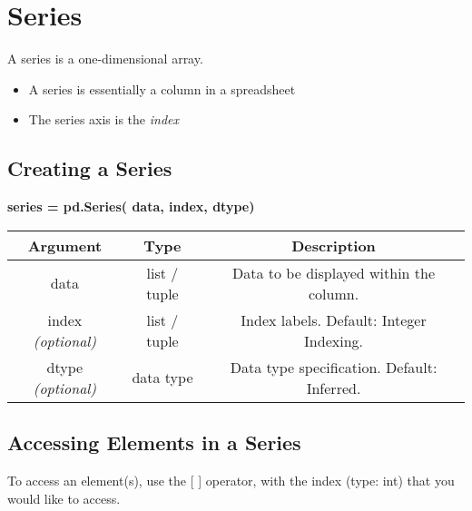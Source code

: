 

\section{Series}
A series is a one-dimensional array. 
\begin{itemize}
    \item A series is essentially a column in a spreadsheet
    \item The series axis is the \textit{index}
\end{itemize}



\subsection{Creating a Series}

\begin{center}
    \textbf{series = pd.Series( data, index, dtype)}
\end{center}

\begin{center}
    \begin{tabular}{c|c|c}
       Argument  & Type & Description  \\
       \hline
         data & list / tuple & Data to be displayed within the column.\\
         index \textit{(optional)}& list / tuple & Index labels. Default: Integer Indexing.\\
         dtype \textit{(optional)} & data type  & Data type specification. Default: Inferred.
    \end{tabular}
\end{center}

\subsection{Accessing Elements in a Series}
To access an element(s), use the [ ] operator, with the index (type: int) that you would like to access.



